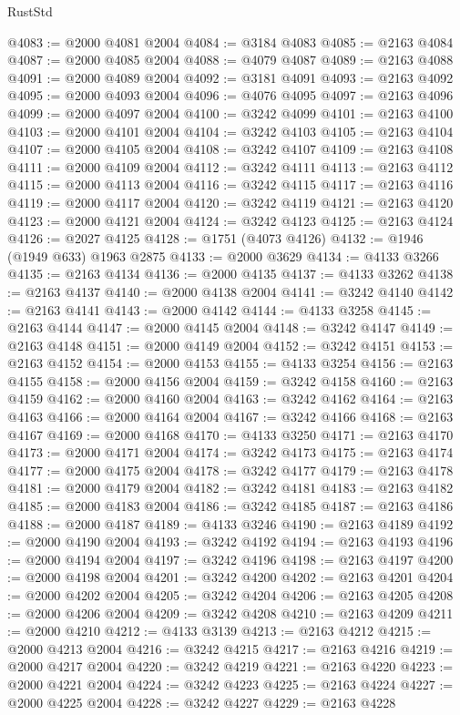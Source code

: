 \begin{lexlean}{RustStd}
\begin{coremodule}
{\begin{coremodule}
{{{{{{{{{{{{{{{{{{{{{{{{{{{{{{{@4083 := @2000 @4081 @2004
@4084 := @3184 @4083
@4085 := @2163 @4084
@4087 := @2000 @4085 @2004
@4088 := @4079 @4087
@4089 := @2163 @4088
@4091 := @2000 @4089 @2004
@4092 := @3181 @4091
@4093 := @2163 @4092
@4095 := @2000 @4093 @2004
@4096 := @4076 @4095
@4097 := @2163 @4096
@4099 := @2000 @4097 @2004
@4100 := @3242 @4099
@4101 := @2163 @4100
@4103 := @2000 @4101 @2004
@4104 := @3242 @4103
@4105 := @2163 @4104
@4107 := @2000 @4105 @2004
@4108 := @3242 @4107
@4109 := @2163 @4108
@4111 := @2000 @4109 @2004
@4112 := @3242 @4111
@4113 := @2163 @4112
@4115 := @2000 @4113 @2004
@4116 := @3242 @4115
@4117 := @2163 @4116
@4119 := @2000 @4117 @2004
@4120 := @3242 @4119
@4121 := @2163 @4120
@4123 := @2000 @4121 @2004
@4124 := @3242 @4123
@4125 := @2163 @4124
@4126 := @2027 @4125
@4128 := @1751 (@4073 @4126)
@4132 := @1946 (@1949 @633) @1963 @2875
@4133 := @2000 @3629
@4134 := @4133 @3266
@4135 := @2163 @4134
@4136 := @2000 @4135
@4137 := @4133 @3262
@4138 := @2163 @4137
@4140 := @2000 @4138 @2004
@4141 := @3242 @4140
@4142 := @2163 @4141
@4143 := @2000 @4142
@4144 := @4133 @3258
@4145 := @2163 @4144
@4147 := @2000 @4145 @2004
@4148 := @3242 @4147
@4149 := @2163 @4148
@4151 := @2000 @4149 @2004
@4152 := @3242 @4151
@4153 := @2163 @4152
@4154 := @2000 @4153
@4155 := @4133 @3254
@4156 := @2163 @4155
@4158 := @2000 @4156 @2004
@4159 := @3242 @4158
@4160 := @2163 @4159
@4162 := @2000 @4160 @2004
@4163 := @3242 @4162
@4164 := @2163 @4163
@4166 := @2000 @4164 @2004
@4167 := @3242 @4166
@4168 := @2163 @4167
@4169 := @2000 @4168
@4170 := @4133 @3250
@4171 := @2163 @4170
@4173 := @2000 @4171 @2004
@4174 := @3242 @4173
@4175 := @2163 @4174
@4177 := @2000 @4175 @2004
@4178 := @3242 @4177
@4179 := @2163 @4178
@4181 := @2000 @4179 @2004
@4182 := @3242 @4181
@4183 := @2163 @4182
@4185 := @2000 @4183 @2004
@4186 := @3242 @4185
@4187 := @2163 @4186
@4188 := @2000 @4187
@4189 := @4133 @3246
@4190 := @2163 @4189
@4192 := @2000 @4190 @2004
@4193 := @3242 @4192
@4194 := @2163 @4193
@4196 := @2000 @4194 @2004
@4197 := @3242 @4196
@4198 := @2163 @4197
@4200 := @2000 @4198 @2004
@4201 := @3242 @4200
@4202 := @2163 @4201
@4204 := @2000 @4202 @2004
@4205 := @3242 @4204
@4206 := @2163 @4205
@4208 := @2000 @4206 @2004
@4209 := @3242 @4208
@4210 := @2163 @4209
@4211 := @2000 @4210
@4212 := @4133 @3139
@4213 := @2163 @4212
@4215 := @2000 @4213 @2004
@4216 := @3242 @4215
@4217 := @2163 @4216
@4219 := @2000 @4217 @2004
@4220 := @3242 @4219
@4221 := @2163 @4220
@4223 := @2000 @4221 @2004
@4224 := @3242 @4223
@4225 := @2163 @4224
@4227 := @2000 @4225 @2004
@4228 := @3242 @4227
@4229 := @2163 @4228
}}}}}}}}}}}}}}}}}}}}}}}}}}}}}}}
\end{coremodule}}
\end{coremodule}
\end{lexlean}

